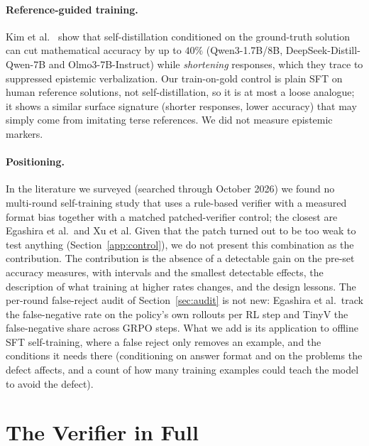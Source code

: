 \documentclass[runningheads]{llncs}
\begin{document}
\paragraph{Reference-guided training.}
{\sloppy Kim et al.~\cite{ref_selfdistill} show that self-distillation conditioned on the
ground-truth solution can cut mathematical accuracy by up to $40\%$ (Qwen3-1.7B/8B,
DeepSeek-Distill-Qwen-7B and Olmo3-7B-Instruct) while \emph{shortening} responses,
which they trace to suppressed epistemic verbalization. Our train-on-gold control
is plain SFT on human reference solutions, not self-distillation, so it is at
most a loose analogue; it shows a similar surface signature (shorter responses,
lower accuracy) that may simply come from imitating terse references. We did not
measure epistemic markers.\par}

\paragraph{Positioning.}
In the literature we surveyed (searched through October 2026) we found no
multi-round self-training study that uses a rule-based verifier with a measured
format bias together with a matched patched-verifier control; the
closest are Egashira et al.\ and Xu et al. Given that the patch turned out to be
too weak to test anything (Section~\ref{app:control}), we do not present this
combination as the contribution. The contribution is the absence of a
detectable gain on the pre-set accuracy measures, with intervals and the
smallest detectable effects, the description of what training at higher rates
changes, and the design lessons. The per-round false-reject audit of
Section~\ref{sec:audit} is not new: Egashira et al.\ track the false-negative
rate on the policy's own rollouts per RL step and TinyV the false-negative
share across GRPO steps. What we add is its application to offline SFT
self-training, where a false reject only removes an example, and the
conditions it needs there (conditioning on answer format and on the problems
the defect affects, and a count of how many training examples could teach
the model to avoid the defect).
\section{The Verifier in Full}
\label{app:verifier}
\end{document}
